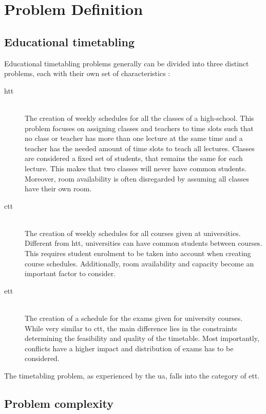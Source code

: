 
\section{Problem Definition}\label{sec:problem}

\subsection{Educational timetabling}
Educational timetabling problems generally can be divided into three distinct problems, each with their own set of characteristics \cite{schaerf1996, kingston2013}:

\begin{description}
   \item [\acrfull{htt}] \hfill \\ The creation of weekly schedules for all the classes of a high-school. This problem focuses on assigning classes and teachers to time slots such that no class or teacher has more than one lecture at the same time and a teacher has the needed amount of time slots to teach all lectures. Classes are considered a fixed set of students, that remains the same for each lecture. This makes that two classes will never have common students. Moreover, room availability is often disregarded by assuming all classes have their own room.
   \item [\acrfull{ctt}] \hfill \\ The creation of weekly schedules for all courses given at universities. Different from \acrshort{htt}, universities can have common students between courses. This requires student enrolment to be taken into account when creating course schedules. Additionally, room availability and capacity become an important factor to consider.
   \item [\acrfull{ett}] \hfill \\ The creation of a schedule for the exams given for university courses. While very similar to \acrshort{ctt}, the main difference lies in the constraints determining the feasibility and quality of the timetable. Most importantly, conflicts have a higher impact and distribution of exams has to be considered.
\end{description}

The timetabling problem, as experienced by the \acrfull{ua}, falls into the category of \acrshort{ett}. 

\subsection{Problem complexity}

